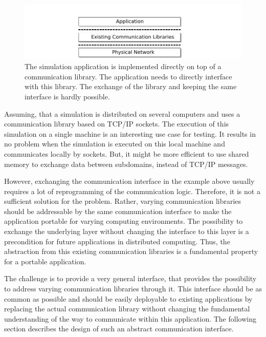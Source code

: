 \begin{figure}[H]
  \centering \includegraphics[width=\textwidth]{graphics/30_design_state_of_the_art}
  \caption{The simulation application is implemented directly on top
    of a communication library. The application needs to directly
    interface with this library. The exchange of the library and
    keeping the same interface is hardly possible.}
  \label{fig:design_state_of_the_art}
\end{figure}

\noindent Assuming, that a simulation is distributed on several computers and uses a
communication library based on TCP/IP sockets. The execution of this
simulation on a single machine is an interesting use case for
testing. It results in no problem when the simulation is executed on
this local machine and communicates locally by sockets.  But, it might
be more efficient to use shared memory to exchange data between
subdomains, instead of TCP/IP messages.

However, exchanging the communication interface in the example above
usually requires a lot of reprogramming of the communication logic.
Therefore, it is not a sufficient solution for the problem.  Rather,
varying communication libraries should be addressable by the same
communication interface to make the application portable for varying
computing environments. The possibility to exchange the
underlying layer without changing the interface to this layer is a
precondition for future applications in distributed computing.  Thus,
the abstraction from this existing communication libraries is a
fundamental property for a portable application.

The challenge is to provide a very general interface, that provides
the possibility to address varying communication libraries through it.
This interface should be as common as possible and should be easily
deployable to existing applications by replacing the actual
communication library without changing the fundamental understanding
of the way to communicate within this application. The following
section describes the design of such an abstract communication
interface.


